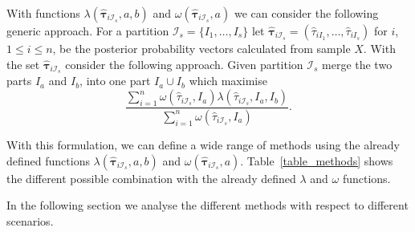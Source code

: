 \documentclass[10pt, a4paper]{article}
\newcommand{\m}[1]{\boldsymbol{#1}}
\begin{document}
With functions $\lambda(\hat{\m \tau}_{i \mathcal{I}_s}, a, b)$ and $\omega(\hat{\m \tau}_{i \mathcal{I}_s}, a)$ we can consider the following generic approach. For a partition $\mathcal{I}_s = \{ I_1, \dots, I_s\}$ let $\hat{\m\tau}_{i \mathcal{I}_s} = \left( \hat{\tau}_{i I_1} , \dots, \hat{\tau}_{i I_s}  \right)$ for $i$, $1 \leq i \leq n$, be the posterior probability vectors calculated from sample $X$. With the set $\hat{\m\tau}_{i \mathcal{I}_s}$ consider the following approach. Given partition $\mathcal{I}_s$ merge the two parts $I_a$ and $I_b$, into one part $I_a \cup I_b$ which maximise
\begin{equation}\label{unifying_equation}
\frac{\sum_{i=1}^n \omega(\hat{\tau}_{i \mathcal{I}_s}, I_a) \lambda(\hat{\tau}_{i \mathcal{I}_s}, I_a, I_b)}{\sum_{i=1}^n \omega(\hat{\tau}_{i \mathcal{I}_s}, I_a) }.
\end{equation}


With this formulation, we can define a wide range of methods using the already defined functions $\lambda(\hat{\m \tau}_{i \mathcal{I}_s}, a, b)$ and $\omega(\hat{\m \tau}_{i \mathcal{I}_s}, a)$. Table~\ref{table_methods} shows the different possible combination with the already defined $\lambda$ and $\omega$ functions. 

In the following section we analyse the different methods with respect to different scenarios.

\end{document}
